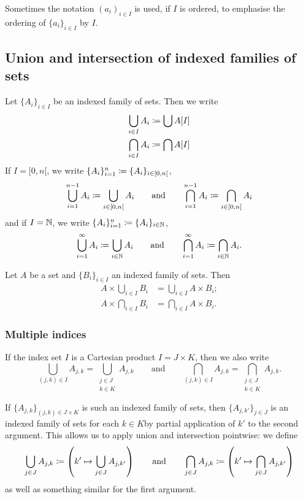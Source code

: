 Sometimes the notation $(a_i)_{i\in I}$ is used, if $I$ is ordered, to emphasise the ordering of $\{a_i\}_{i\in I}$ by $I$.

\subsection{Union and intersection of indexed families of sets}
Let $\{A_i\}_{i\in I}$ be an indexed family of sets. Then we write
\begin{align*}
\bigcup_{i\in I} A_i &\coloneqq \bigcup A[I] \\
\bigcap_{i\in I} A_i &\coloneqq \bigcap A[I]
\end{align*}
If $I = [0,n[$, we write $\{A_i\}_{i=1}^{n} \coloneqq \{A_i\}_{i\in [0,n[}$,
\[ \bigcup_{i=1}^{n-1} A_i \coloneqq \bigcup_{i\in [0,n[} A_i \qquad \text{and} \qquad \bigcap_{i=1}^{n-1} A_i \coloneqq \bigcap_{i\in [0,n[} A_i \]
and if $I=\mathbb{N}$, we write $\{A_i\}_{i=1}^{n} \coloneqq \{A_i\}_{i\in \mathbb{N}}$,
\[ \bigcup_{i=1}^{\infty} A_i \coloneqq \bigcup_{i\in \mathbb{N}} A_i \qquad \text{and} \qquad \bigcap_{i=1}^{\infty} A_i \coloneqq \bigcap_{i\in \mathbb{N}} A_i. \]

\begin{lemma}
Let $A$ be a set and $\{B_i\}_{i\in I}$ an indexed family of sets. Then
\begin{align*}
A\times \bigcup_{i\in I} B_i &= \bigcup_{i\in I}A\times B_i; \\
A\times \bigcap_{i\in I} B_i &= \bigcap_{i\in I}A\times B_i.
\end{align*}
\end{lemma}

\subsubsection{Multiple indices}
If the index set $I$ is a Cartesian product $I=J\times K$, then we also write
\[ \bigcup_{(j,k)\in I} A_{j,k} = \bigcup_{\substack{j\in J \\ k\in K}} A_{j,k} \qquad\text{and}\qquad \bigcap_{(j,k)\in I} A_{j,k} = \bigcap_{\substack{j\in J \\ k\in K}} A_{j,k}. \]

If $\{A_{j,k}\}_{(j,k) \in J\times K}$ is such an indexed family of sets, then $\{A_{j,k'}\}_{j\in J}$ is an indexed family of sets for each $k\in K$by partial application of $k'$ to the second argument. This allows us to apply union and intersection pointwise: we define
\[ \bigcup_{j\in J}A_{j,k} \coloneqq \left(k'\mapsto \bigcup_{j\in J}A_{j,k'}\right) \qquad\text{and}\qquad \bigcap_{j\in J}A_{j,k} \coloneqq \left(k'\mapsto \bigcap_{j\in J}A_{j,k'}\right) \]
as well as something similar for the first argument.

